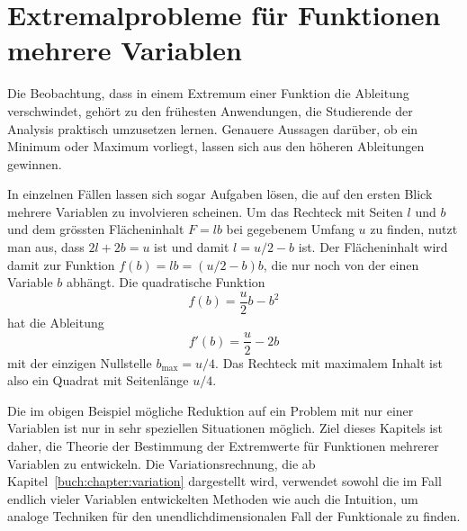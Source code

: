 %
%
%
\chapter{Extremalprobleme für Funktionen mehrere Variablen
\label{buch:chapter:fuvar}}
Die Beobachtung, dass in einem Extremum einer Funktion die Ableitung
verschwindet, gehört zu den frühesten Anwendungen, die Studierende
der Analysis praktisch umzusetzen lernen.
Genauere Aussagen darüber, ob ein Minimum oder Maximum 
vorliegt, lassen sich aus den höheren Ableitungen gewinnen.

In einzelnen Fällen lassen sich sogar Aufgaben lösen, die auf
den ersten Blick mehrere Variablen zu involvieren scheinen.
Um das Rechteck mit Seiten $l$ und $b$ und dem grössten Flächeninhalt
$F=lb$ bei gegebenem Umfang $u$ zu finden, nutzt man aus, dass $2l+2b=u$ ist
und damit $l=u/2-b$ ist.
Der Flächeninhalt wird damit zur Funktion $f(b)=lb=(u/2-b)b$, die nur
noch von der einen Variable $b$ abhängt. 
Die quadratische Funktion
\[
f(b) = \frac{u}2b-b^2
\]
hat die Ableitung
\[
f'(b) = \frac{u}2-2b
\]
mit der einzigen Nullstelle $b_{\text{max}}=u/4$.
Das Rechteck mit maximalem Inhalt ist also ein Quadrat mit Seitenlänge
$u/4$.

Die im obigen Beispiel mögliche Reduktion auf ein Problem mit nur einer
Variablen ist nur in sehr speziellen Situationen möglich.
Ziel dieses Kapitels ist daher, die Theorie der Bestimmung der
Extremwerte für Funktionen mehrerer Variablen zu entwickeln.
Die Variationsrechnung, die ab Kapitel~\ref{buch:chapter:variation}
dargestellt wird, verwendet sowohl die im Fall endlich vieler Variablen
entwickelten Methoden wie auch die Intuition, um analoge Techniken
für den unendlichdimensionalen Fall der Funktionale zu finden.






%

